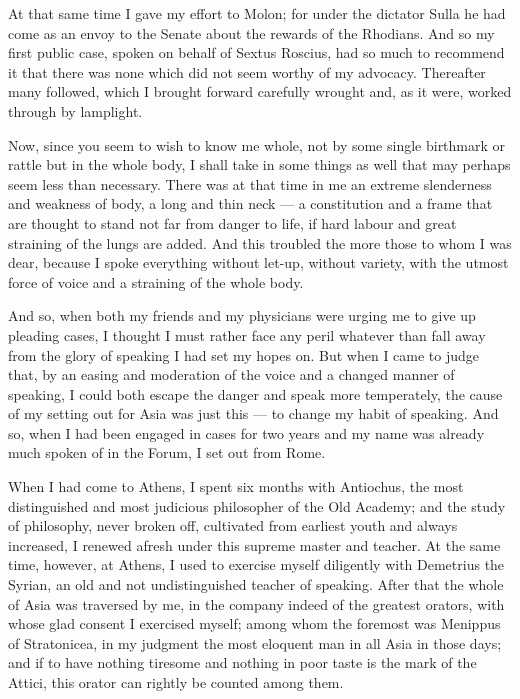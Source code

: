  At that same time I gave my effort to Molon; for under the dictator Sulla he had come as an envoy to the Senate about the rewards of the Rhodians. And so my first public case, spoken on behalf of Sextus Roscius, had so much to recommend it that there was none which did not seem worthy of my advocacy. Thereafter many followed, which I brought forward carefully wrought and, as it were, worked through by lamplight.

 Now, since you seem to wish to know me whole, not by some single birthmark or rattle but in the whole body, I shall take in some things as well that may perhaps seem less than necessary. There was at that time in me an extreme slenderness and weakness of body, a long and thin neck — a constitution and a frame that are thought to stand not far from danger to life, if hard labour and great straining of the lungs are added. And this troubled the more those to whom I was dear, because I spoke everything without let-up, without variety, with the utmost force of voice and a straining of the whole body.

 And so, when both my friends and my physicians were urging me to give up pleading cases, I thought I must rather face any peril whatever than fall away from the glory of speaking I had set my hopes on. But when I came to judge that, by an easing and moderation of the voice and a changed manner of speaking, I could both escape the danger and speak more temperately, the cause of my setting out for Asia was just this — to change my habit of speaking. And so, when I had been engaged in cases for two years and my name was already much spoken of in the Forum, I set out from Rome.

 When I had come to Athens, I spent six months with Antiochus, the most distinguished and most judicious philosopher of the Old Academy; and the study of philosophy, never broken off, cultivated from earliest youth and always increased, I renewed afresh under this supreme master and teacher. At the same time, however, at Athens, I used to exercise myself diligently with Demetrius the Syrian, an old and not undistinguished teacher of speaking. After that the whole of Asia was traversed by me, in the company indeed of the greatest orators, with whose glad consent I exercised myself; among whom the foremost was Menippus of Stratonicea, in my judgment the most eloquent man in all Asia in those days; and if to have nothing tiresome and nothing in poor taste is the mark of the Attici, this orator can rightly be counted among them.

